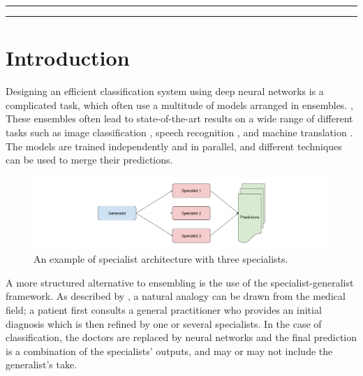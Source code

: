 \documentclass[12pt]{article}
\makeatletter
\def\maketitle{
    \begin{centering}
    \par\rule{\textwidth}{2pt}
    \par\hfill
    \par\textbf{\LARGE\@title}
    \par\hfill
    \par{\textit{\@author}}
    \par\hfill
    \par{\@date}
    \par\rule{\textwidth}{2pt}
    \end{centering}
}
\makeatother
\begin{document}
\thispagestyle{empty}
\maketitle
\hfill



\section{Introduction}\label{introduction}

Designing an efficient classification system using deep neural networks
is a complicated task, which often use a multitude of models arranged in
ensembles. \cite{galaxy}, \cite{vgg} These ensembles often lead to
state-of-the-art results on a wide range of different tasks such as
image classification \cite{inception}, speech recognition
\cite{deepspeech2}, and machine translation \cite{seq2seq}. The
models are trained independently and in parallel, and different
techniques can be used to merge their predictions.

\begin{figure}[b]
\centering
\includegraphics[width=\textwidth]{./figs/specialists.png}
\caption{An example of specialist architecture with three specialists.}
\label{fig:1}
\end{figure}

A more structured alternative to ensembling is the use of the
specialist-generalist framework. As described by \cite{bochereau1990}, a
natural analogy can be drawn from the medical field; a patient first
consults a general practitioner who provides an initial diagnosis which
is then refined by one or several specialists. In the case of
classification, the doctors are replaced by neural networks and the
final prediction is a combination of the specialists' outputs, and may
or may not include the generalist's take.
\end{document}
